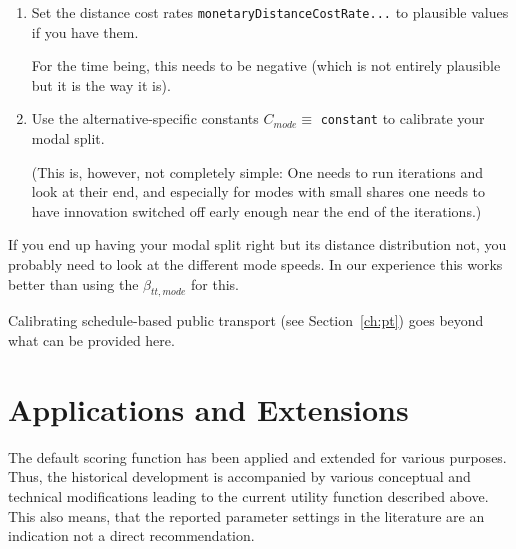 \begin{enumerate}
\item Set the distance cost rates \verb$monetaryDistanceCostRate...$ to plausible values if you have them.

For the time being, this needs to be negative (which is not entirely plausible but it is the way it is).

\item Use the alternative-specific constants $C_{mode} \equiv$ \verb$constant$ to calibrate your modal split.

(This is, however, not completely simple: One needs to run iterations and look at their end, and especially for modes with small shares one needs to have innovation switched off early enough near the end of the iterations.)

\end{enumerate}

If you end up having your modal split right but its distance distribution not, you probably need to look at the different mode speeds.  In our experience this works better than using the $\beta_{tt,mode}$ for this.

Calibrating schedule-based public transport (see Section~\ref{ch:pt}) goes beyond what can be provided here.

\section{Applications and Extensions}
\label{sec:appsExtensions}

The default scoring function has been applied and extended for various purposes. 
Thus, the historical development is accompanied by various conceptual and technical modifications leading to the current utility function described above. This also means, that the reported parameter settings in the literature are an indication not a direct recommendation.

